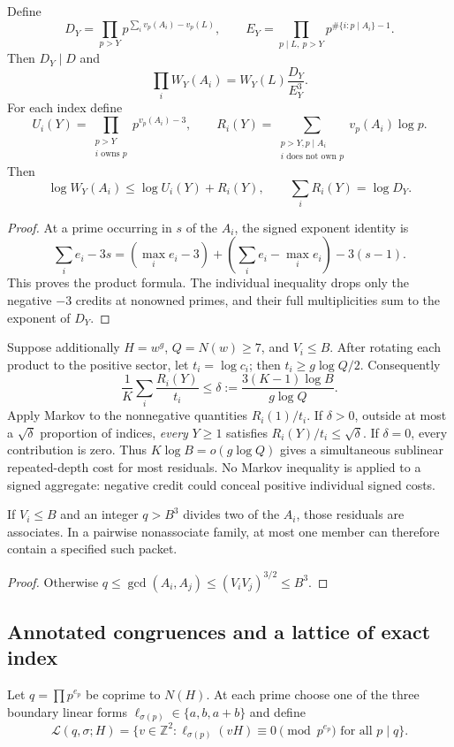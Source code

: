 \begin{theorem}\label{rc-signed}
Define
\[
 D_Y=\prod_{p>Y}p^{\sum_i v_p(A_i)-v_p(L)},\qquad
 E_Y=\prod_{p\mid L,\ p>Y}p^{\#\{i:p\mid A_i\}-1}.
\]
Then $D_Y\mid D$ and
\[
 \prod_iW_Y(A_i)=W_Y(L)\frac{D_Y}{E_Y^3}.
\]
For each index define
\[
 U_i(Y)=\prod_{\substack{p>Y\\i\text{ owns }p}}p^{v_p(A_i)-3},\qquad
 R_i(Y)=\sum_{\substack{p>Y, p\mid A_i\\i\text{ does not own }p}}
                       v_p(A_i)\log p.
\]
Then
\[
 \log W_Y(A_i)\le\log U_i(Y)+R_i(Y),\qquad
 \sum_iR_i(Y)=\log D_Y.
\]
\end{theorem}
\begin{proof}
At a prime occurring in $s$ of the $A_i$, the signed exponent identity is
\[
 \sum_i e_i-3s=(\max_i e_i-3)+(\sum_i e_i-\max_i e_i)-3(s-1).
\]
This proves the product formula. The individual inequality drops only the
negative $-3$ credits at nonowned primes, and their full multiplicities sum
to the exponent of $D_Y$.
\end{proof}

Suppose additionally $H=w^g$, $Q=N(w)\ge7$, and $V_i\le B$.
After rotating each product to the positive sector, let $t_i=\log c_i$;
then $t_i\ge g\log Q/2$. Consequently
\begin{equation}\label{rc-average}
 \frac1K\sum_i\frac{R_i(Y)}{t_i}
 \le\delta:=\frac{3(K-1)\log B}{g\log Q}.
\end{equation}
Apply Markov to the nonnegative quantities $R_i(1)/t_i$. If $\delta>0$,
outside at most a $\sqrt\delta$ proportion of indices, \emph{every} $Y\ge1$
satisfies $R_i(Y)/t_i\le\sqrt\delta$. If $\delta=0$, every contribution is zero.
Thus $K\log B=o(g\log Q)$ gives a simultaneous sublinear repeated-depth
cost for most residuals. No Markov inequality is applied to a signed aggregate:
negative credit could conceal positive individual signed costs.

\begin{corollary}\label{rc-packet}
If $V_i\le B$ and an integer $q>B^3$ divides two of the $A_i$, those
residuals are associates. In a pairwise nonassociate family, at most one member
can therefore contain a specified such packet.
\end{corollary}
\begin{proof}
Otherwise $q\le\gcd(A_i,A_j)\le(V_iV_j)^{3/2}\le B^3$.
\end{proof}

\subsection{Annotated congruences and a lattice of exact index}
Let $q=\prod p^{e_p}$ be coprime to $N(H)$. At each prime choose one of the
three boundary linear forms $\ell_{\sigma(p)}\in\{a,b,a+b\}$ and define
\[
 \mathcal L(q,\sigma;H)=
 \{v\in\mathbb Z^2:\ell_{\sigma(p)}(vH)\equiv0\pmod{p^{e_p}}
                              \text{ for all }p\mid q\}.
\]

